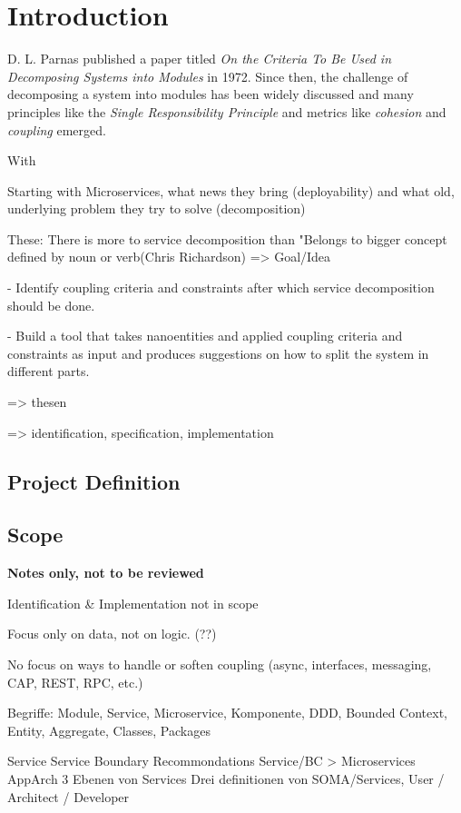 \chapter{Introduction}

D. L. Parnas published a paper titled \textit{On the Criteria To Be Used in Decomposing Systems into Modules}\cite{parnaDecomposing} in 1972. Since then, the challenge of decomposing a system into modules has been widely discussed and many principles like the \textit{Single Responsibility Principle} and metrics like \textit{cohesion} and \textit{coupling} emerged. 

With 

Starting with Microservices, what news they bring (deployability) and what old, underlying problem they try to solve (decomposition)

These: There is more to service decomposition than "Belongs to bigger concept defined by noun or verb(Chris Richardson)
=> Goal/Idea

- Identify coupling criteria and constraints after which service 
decomposition should be done. 

- Build a tool that takes nanoentities and applied coupling criteria and constraints as input and produces suggestions on how to split the system in different parts. 

=> thesen

=> identification, specification, implementation

\section{Project Definition}



\section{Scope}

\textbf{Notes only, not to be reviewed}

Identification \& Implementation not in scope

Focus only on data, not on logic. (??)

No focus on ways to handle or soften coupling (async, interfaces, messaging, CAP, REST, RPC, etc.)

Begriffe: Module, Service, Microservice, Komponente, DDD, Bounded Context, Entity, Aggregate, Classes, Packages

Service
Service Boundary Recommondations
Service/BC > Microservices 
AppArch 3 Ebenen von Services
Drei definitionen von SOMA/Services, User / Architect / Developer